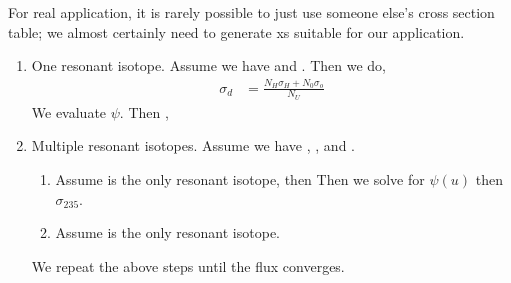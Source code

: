 \documentclass{school-22.211-notes}
\begin{document}
For real application, it is rarely possible to just use someone else's cross section table; we almost certainly need to generate xs suitable for our application. 



\clearpage
{}
\begin{enumerate}
\item One resonant isotope. Assume we have  and . Then we do, 
\begin{align}
\sigma_d &= \frac{N_H \sigma_H + N_0 \sigma_o}{N_U} 
\end{align}
We evaluate $\psi$. Then ,

\item Multiple resonant isotopes. Assume we have , , and . 
  \begin{enumerate}
  \item Assume  is the only resonant isotope, then 
    Then we solve for $\psi(u)$ then $\sigma_{235}$. 
  \item Assume  is the only resonant isotope. 
  \end{enumerate}
  We repeat the above steps until the flux converges. 
\end{enumerate}
\end{document}
